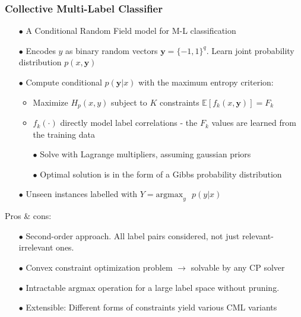 \documentclass{beamer}
\begin{document}
\begin{frame}
\frametitle{Collective Multi-Label Classifier}
\begin{itemize}
\item[$\bullet$] A Conditional Random Field model for M-L classification
\item[$\bullet$] Encodes $y$ as binary random vectors $\bm{y}=\{-1,1\}^q$.
  Learn joint probability distribution $p(x,\bm{y})$
\item[$\bullet$] Compute conditional $p(\bm{y} | x)$ with the maximum entropy criterion:
  \begin{itemize}
    \item Maximize $H_p(x,y)$ subject to $K$ constraints $\mathbb{E}[f_k(x,\bm{y})] = F_k$
    \item $f_k(\cdot)$ directly model label correlations - the $F_k$ values are learned from the training data
  \item[$\bullet$] Solve with Lagrange multipliers, assuming gaussian priors
  \item[$\bullet$] Optimal solution is in the form of a Gibbs probability distribution
  \end{itemize}
\item[$\bullet$] Unseen instances labelled with $Y = \text{argmax}_y\text{ } p(y | x)$
\end{itemize}
Pros \& cons:
\begin{itemize}
\item[$\bullet$] Second-order approach. All label pairs considered, not just relevant-irrelevant ones.
\item[$\bullet$] Convex constraint optimization problem $\rightarrow$ solvable by any
  CP solver
\item[$\bullet$] Intractable $\text{argmax}$ operation for a large label space without pruning.
\item[$\bullet$] Extensible: Different forms of constraints yield various CML variants
\end{itemize}
\end{frame}
\end{document}
